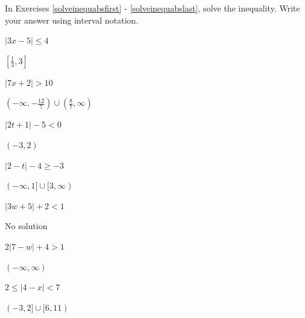 \documentclass{ximera}
\begin{document}
\begin{question}
In Exercises \ref{solveinequabsfirst} - \ref{solveinequabslast}, solve the inequality.  Write your answer using interval notation. 

\begin{problem}\label{solveinequabsfirst}
$|3x - 5| \leq 4$

\begin{solution}
$\left[\frac{1}{3}, 3\right]$
\end{solution}
\end{problem}

\begin{problem}
$|7x + 2| > 10$

\begin{solution}
$\left(-\infty, -\frac{12}{7} \right) \cup \left(\frac{8}{7}, \infty\right)$
\end{solution}
\end{problem}

\begin{problem}
$|2t+1| - 5 < 0$

\begin{solution}
$(-3,2)$ 
\end{solution}
\end{problem}

\begin{problem}
$|2-t| - 4 \geq -3$

\begin{solution}
$(-\infty,1] \cup [3,\infty)$
\end{solution}
\end{problem}

\begin{problem}
$|3w+5| + 2 < 1$

\begin{solution}
No solution 
\end{solution}
\end{problem}

\begin{problem}
$2|7-w| +4 > 1$

\begin{solution}
$(-\infty, \infty)$
\end{solution}
\end{problem}

\begin{problem}
$2 \leq |4-x| < 7$ 

\begin{solution}
$(-3,2] \cup [6,11)$
\end{solution}
\end{problem}


\end{question}
\end{document}
